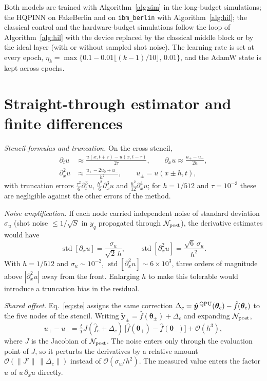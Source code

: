 \documentclass[floatfix,aps,pra,twocolumn,superscriptaddress,10pt,nofootinbib]{revtex4-2}
\begin{document}
\begin{appendices}
Both models are trained with Algorithm~\ref{alg:sim} in the long-budget simulations; the HQPINN on FakeBerlin and on \texttt{ibm\_berlin} with Algorithm~\ref{alg:hil}; the classical control and the hardware-budget simulations follow the loop of Algorithm~\ref{alg:hil} with the device replaced by the classical middle block or by the ideal layer (with or without sampled shot noise). The learning rate is set at every epoch, $\eta_k=\max\{0.1-0.01\lfloor(k-1)/10\rfloor,\,0.01\}$, and the AdamW state is kept across epochs.

\section{Straight-through estimator and finite differences}\label{app:ste}
\emph{Stencil formulas and truncation.} On the cross stencil,
\begin{align}
  \partial_tu&\approx\frac{u(x,t+\tau)-u(x,t-\tau)}{2\tau},\qquad \partial_xu\approx\frac{u_{+}-u_{-}}{2h},\nonumber\\
  \partial_x^2u&\approx\frac{u_{+}-2u_0+u_{-}}{h^2},\qquad u_\pm=u(x\pm h,t),
\end{align}
with truncation errors $\tfrac{\tau^2}{6}\partial_t^3u$, $\tfrac{h^2}{6}\partial_x^3u$ and $\tfrac{h^2}{12}\partial_x^4u$; for $h=1/512$ and $\tau=10^{-3}$ these are negligible against the other errors of the method.

\emph{Noise amplification.} If each node carried independent noise of standard deviation $\sigma_u$ (shot noise $\le1/\sqrt S$ in $y_q$ propagated through $\mathcal N_{\rm post}$), the derivative estimates would have
\begin{equation}
  \operatorname{std}[\partial_xu]=\frac{\sigma_u}{\sqrt2\,h},\qquad \operatorname{std}[\partial_x^2u]=\frac{\sqrt6\,\sigma_u}{h^2}.
\end{equation}
With $h=1/512$ and $\sigma_u\sim10^{-2}$, $\operatorname{std}[\partial_x^2u]\sim6\times10^3$, three orders of magnitude above $|\partial_x^2u|$ away from the front. Enlarging $h$ to make this tolerable would introduce a truncation bias in the residual.

\emph{Shared offset.} Eq.~\eqref{eq:ste} assigns the same correction $\Delta_c=\hat{\bm y}^{\,\rm QPU}(\bm\theta_c)-\hat f(\bm\theta_c)$ to the five nodes of the stencil. Writing $\tilde{\bm y}_\pm=\hat f(\bm\theta_\pm)+\Delta_c$ and expanding $\mathcal N_{\rm post}$,
\begin{equation}
  u_+-u_-=\tfrac{t}{T}J(\hat f_c+\Delta_c)\,\big[\hat f(\bm\theta_+)-\hat f(\bm\theta_-)\big]+\mathcal O(h^3),
\end{equation}
where $J$ is the Jacobian of $\mathcal N_{\rm post}$. The noise enters only through the evaluation point of $J$, so it perturbs the derivatives by a relative amount $\mathcal O(\|J'\|\,\|\Delta_c\|)$ instead of $\mathcal O(\sigma_u/h^2)$. The measured value enters the factor $u$ of $u\,\partial_xu$ directly.


\end{appendices}
\end{document}
